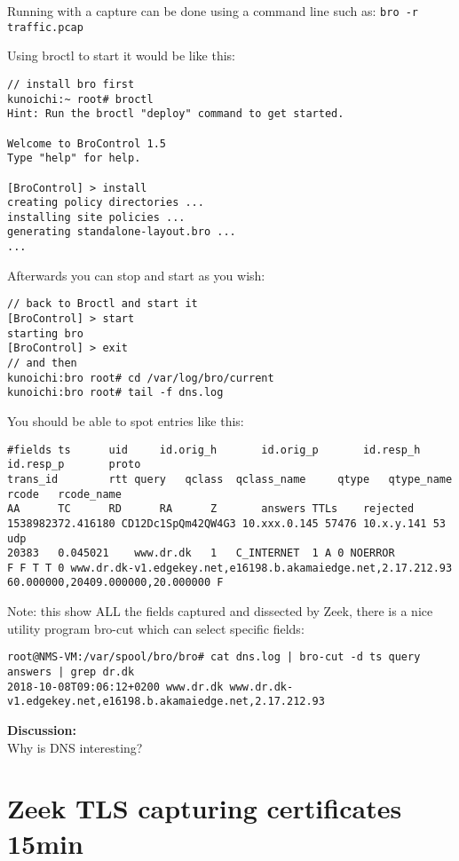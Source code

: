 \documentclass[a4paper,11pt,notitlepage]{report}
\begin{document}
Running with a capture can be done using a command line such as:
\verb+bro -r traffic.pcap+

Using broctl to start it would be like this:
\begin{verbatim}
// install bro first
kunoichi:~ root# broctl
Hint: Run the broctl "deploy" command to get started.

Welcome to BroControl 1.5
Type "help" for help.

[BroControl] > install
creating policy directories ...
installing site policies ...
generating standalone-layout.bro ...
...
\end{verbatim}

Afterwards you can stop and start as you wish:
\begin{verbatim}
// back to Broctl and start it
[BroControl] > start
starting bro
[BroControl] > exit
// and then
kunoichi:bro root# cd /var/log/bro/current
kunoichi:bro root# tail -f dns.log
\end{verbatim}

You should be able to spot entries like this:
\begin{verbatim}
#fields ts      uid     id.orig_h       id.orig_p       id.resp_h       id.resp_p       proto
trans_id        rtt query   qclass  qclass_name     qtype   qtype_name      rcode   rcode_name
AA      TC      RD      RA      Z       answers TTLs    rejected
1538982372.416180 CD12Dc1SpQm42QW4G3 10.xxx.0.145 57476 10.x.y.141 53	udp
20383	0.045021	www.dr.dk	1	C_INTERNET	1 A 0 NOERROR
F F T T 0 www.dr.dk-v1.edgekey.net,e16198.b.akamaiedge.net,2.17.212.93 60.000000,20409.000000,20.000000 F
\end{verbatim}

Note: this show ALL the fields captured and dissected by Zeek, there is a nice utility program bro-cut which can select specific fields:

\begin{verbatim}
root@NMS-VM:/var/spool/bro/bro# cat dns.log | bro-cut -d ts query answers | grep dr.dk
2018-10-08T09:06:12+0200 www.dr.dk www.dr.dk-v1.edgekey.net,e16198.b.akamaiedge.net,2.17.212.93
\end{verbatim}

{\bf Discussion:}\\
Why is DNS interesting?


\chapter{Zeek TLS capturing certificates 15min}
\label{ex:zeektlsbasic}
\end{document}
